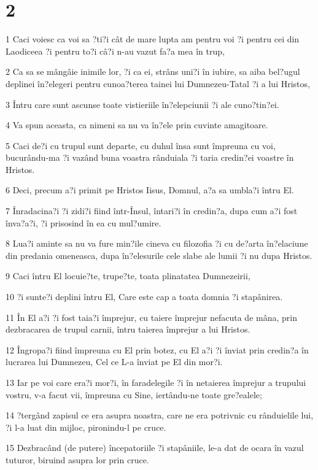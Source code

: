 \chapter{2}

\par 1 Caci voiesc ca voi sa ?ti?i cât de mare lupta am pentru voi ?i pentru cei din Laodiceea ?i pentru to?i câ?i n-au vazut fa?a mea în trup,
\par 2 Ca sa se mângâie inimile lor, ?i ca ei, strâns uni?i în iubire, sa aiba bel?ugul deplinei în?elegeri pentru cunoa?terea tainei lui Dumnezeu-Tatal ?i a lui Hristos,
\par 3 Întru care sunt ascunse toate vistieriile în?elepciunii ?i ale cuno?tin?ei.
\par 4 Va spun aceasta, ca nimeni sa nu va în?ele prin cuvinte amagitoare.
\par 5 Caci de?i cu trupul sunt departe, cu duhul însa sunt împreuna cu voi, bucurându-ma ?i vazând buna voastra rânduiala ?i taria credin?ei voastre în Hristos.
\par 6 Deci, precum a?i primit pe Hristos Iisus, Domnul, a?a sa umbla?i întru El.
\par 7 Înradacina?i ?i zidi?i fiind într-Însul, întari?i în credin?a, dupa cum a?i fost înva?a?i, ?i prisosind în ea cu mul?umire.
\par 8 Lua?i aminte sa nu va fure min?ile cineva cu filozofia ?i cu de?arta în?elaciune din predania omeneasca, dupa în?elesurile cele slabe ale lumii ?i nu dupa Hristos.
\par 9 Caci întru El locuie?te, trupe?te, toata plinatatea Dumnezeirii,
\par 10 ?i sunte?i deplini întru El, Care este cap a toata domnia ?i stapânirea.
\par 11 În El a?i ?i fost taia?i împrejur, cu taiere împrejur nefacuta de mâna, prin dezbracarea de trupul carnii, întru taierea împrejur a lui Hristos.
\par 12 Îngropa?i fiind împreuna cu El prin botez, cu El a?i ?i înviat prin credin?a în lucrarea lui Dumnezeu, Cel ce L-a înviat pe El din mor?i.
\par 13 Iar pe voi care era?i mor?i, în faradelegile ?i în netaierea împrejur a trupului vostru, v-a facut vii, împreuna cu Sine, iertându-ne toate gre?ealele;
\par 14 ?tergând zapisul ce era asupra noastra, care ne era potrivnic cu rânduielile lui, ?i l-a luat din mijloc, pironindu-l pe cruce.
\par 15 Dezbracând (de putere) începatoriile ?i stapâniile, le-a dat de ocara în vazul tuturor, biruind asupra lor prin cruce.
